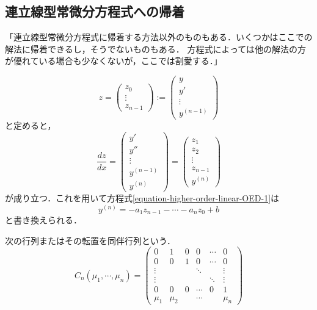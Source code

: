 \documentclass[uplatex,dvipdfmx]{jsreport}
\begin{document}
\subsection{連立線型常微分方程式への帰着}
「連立線型常微分方程式に帰着する方法以外のものもある．いくつかはここでの解法に帰着できるし，そうでないものもある．
方程式によっては他の解法の方が優れている場合も少なくないが，ここでは割愛する．」

\begin{notation}
    \[ z=\begin{pmatrix}z_0\\\vdots\\z_{n-1}\end{pmatrix}:=\begin{pmatrix}y\\y'\\\vdots\\y^{(n-1)}\end{pmatrix} \]
    と定めると，
    \[ \frac{dz}{dx} = \begin{pmatrix}y'\\y''\\\vdots\\y^{(n-1)}\\y^{(n)}\end{pmatrix} = \begin{pmatrix}z_1\\z_2\\\vdots\\z_{n-1}\\y^{(n)}\end{pmatrix} \]
    が成り立つ．これを用いて方程式\ref{equation-higher-order-linear-OED-1}は
    \begin{equation}\label{equation-higher-order-linear-OED-2}
        y^{(n)} = -a_1z_{n-1}-\cdots-a_nz_0+b
    \end{equation}
    と書き換えられる．
\end{notation}
\begin{definition}[Companion行列]次の行列またはその転置を同伴行列という．
    \[ C_n(\mu_1,\cdots,\mu_n)=\begin{pmatrix}0&1&0&0&\cdots&0\\0&0&1&0&\cdots&0\\\vdots&&&\ddots&&\vdots\\\vdots&&&&\ddots&\vdots\\0&0&0&\cdots&0&1\\\mu_1&\mu_2&&\cdots&&\mu_n\end{pmatrix} \]
\end{definition}
\end{document}
